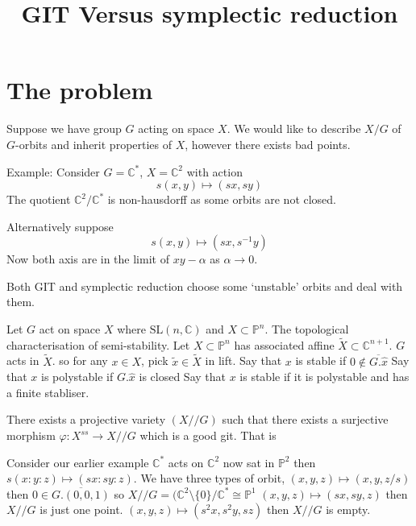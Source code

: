 % 


\title{GIT Versus symplectic reduction}
\author{}
\date{}

 
\maketitle
\section{The problem } %

Suppose we have group $G$ acting on space $X$. 
We would like to describe $ X/G $ of $ G$-orbits and inherit properties of $X$, 
however there exists bad points. 

Example: 
Consider $ G = \mathbb{C} ^* $, $ X = \mathbb{C} ^2 $ with action 
\begin{equation}
    s(x,y) \mapsto (sx, sy) 
\end{equation}
The quotient $ \mathbb{C} ^2 / \mathbb{C} ^* $ is non-hausdorff as some orbits are not closed. 

Alternatively suppose
\begin{equation}
    s(x,y) \mapsto (sx, s^{-1} y) 
\end{equation}
Now both axis are in the limit of $xy- \alpha $ as $\alpha \rightarrow 0 $.

Both GIT and symplectic reduction choose some `unstable' orbits and deal with them. 


Let $ G$ act on space $X$ where $ \mathrm{SL} ( n , \mathbb{C} ) $ and $ X \subset \mathbb{P} ^n $.
The topological characterisation of semi-stability. 
Let $X \subset \mathbb{P} ^n $ has associated affine $ \tilde{X} \subset \mathbb{C} ^{n+1} $. 
$G$ acts in $ \tilde{X} $. 
so for any $ x \in X $, pick $ \tilde{x} \in \tilde{X} $ in lift.
Say that $x$ is stable if $0 \notin \overline{G . \hat{x} } $
Say that $x$ is polystable if $G . \hat{x}  $ is closed 
Say that $x$ is stable if it is polystable and has a finite stabliser.

\begin{theorem}
    There exists a projective variety $( X//G ) $ such that there exists a surjective morphism 
    $\varphi : X^{ss} \rightarrow X//G $ which is a good git. 
    That is 
\end{theorem}

Consider our earlier example $ \mathbb{C}  ^* $ acts on $ \mathbb{C} ^2 $ now sat in $ \mathbb{P} ^2$
then 
$s(x:y:z) \mapsto ( sx: sy: z) $. 
We have three types of orbit, 
$(x,y,z) \mapsto (x,y,z/s) $ then $ 0 \in \overline{G . ( 0,0,1) } $ so $ X// G = (\mathbb{C} ^2 \setminus \{0\} / \mathbb{C} ^* \cong \mathbb{P} ^1 $
$(x,y,z) \mapsto (sx,sy,z) $ then $ X// G $ is just one point.
$(x,y,z) \mapsto (s^2x,s^2 y, sz) $ then $ X// G $ is empty.

